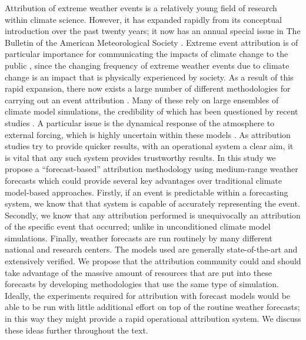   Attribution of extreme weather events is a relatively young field of research within climate science. However, it has expanded rapidly from its conceptual introduction \citep{allen_liability_2003} over the past twenty years; it now has an annual special issue in The Bulletin of the American Meteorological Society \citep{peterson_explaining_2012}. Extreme event attribution is of particular importance for communicating the impacts of climate change to the public \citep{hulme_attributing_2014,hassol_natural_2016}, since the changing frequency of extreme weather events due to climate change is an impact that is physically experienced by society. As a result of this rapid expansion, there now exists a large number of different methodologies for carrying out an event attribution \citep{herring_explaining_2021}. Many of these rely on large ensembles of climate model simulations, the credibility of which has been questioned by recent studies \citep{bellprat_attribution_2016,bellprat_towards_2019,palmer_simple_2018}. A particular issue is the dynamical response of the atmosphere to external forcing, which is highly uncertain within these models \citep{shepherd_common_2016}. As attribution studies try to provide quicker results, with an operational system a clear aim, it is vital that any such system provides trustworthy results. In this study we propose a “forecast-based” attribution methodology using medium-range weather forecasts which could provide several key advantages over traditional climate model-based approaches. Firstly, if an event is predictable within a forecasting system, we know that that system is capable of accurately representing the event. Secondly, we know that any attribution performed is unequivocally an attribution of the specific event that occurred; unlike in unconditioned climate model simulations. Finally, weather forecasts are run routinely by many different national and research centers. The models used are generally state-of-the-art and extensively verified. We propose that the attribution community could and should take advantage of the massive amount of resources that are put into these forecasts by developing methodologies that use the same type of simulation. Ideally, the experiments required for attribution with forecast models would be able to be run with little additional effort on top of the routine weather forecasts; in this way they might provide a rapid operational attribution system. We discuss these ideas further throughout the text.

